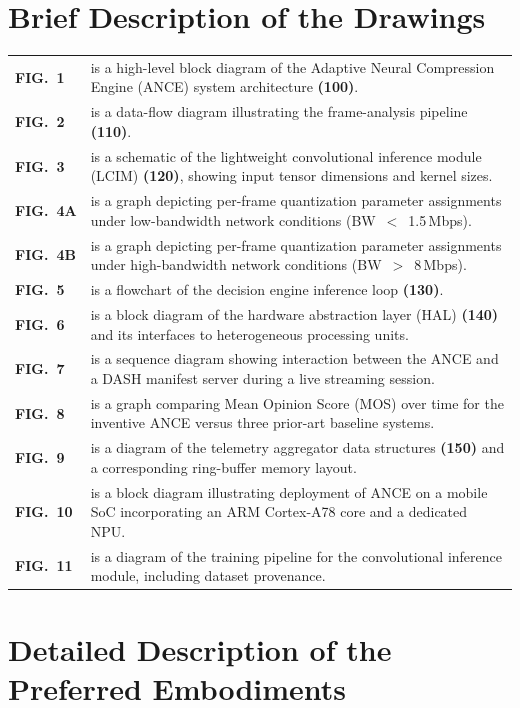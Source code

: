 \documentclass[12pt,letterpaper]{article}
\newcommand{\refnum}[1]{\textbf{(#1)}}
\newcommand{\metarow}[2]{%
  {\color{accent}\bfseries #1} & #2 \\[2pt]%
}
\begin{document}
\section{Brief Description of the Drawings}\label{sec:drawings}

\begin{tabularx}{\linewidth}{@{}>{\color{accent}\bfseries}l@{\hspace{8mm}}>{\raggedright\arraybackslash}X@{}}
  \metarow{FIG.\ 1}{is a high-level block diagram of the Adaptive Neural Compression Engine (ANCE) system architecture \refnum{100}.}
  \metarow{FIG.\ 2}{is a data-flow diagram illustrating the frame-analysis pipeline \refnum{110}.}
  \metarow{FIG.\ 3}{is a schematic of the lightweight convolutional inference module (LCIM) \refnum{120}, showing input tensor dimensions and kernel sizes.}
  \metarow{FIG.\ 4A}{is a graph depicting per-frame quantization parameter assignments under low-bandwidth network conditions (BW~$<$~1.5\,Mbps).}
  \metarow{FIG.\ 4B}{is a graph depicting per-frame quantization parameter assignments under high-bandwidth network conditions (BW~$>$~8\,Mbps).}
  \metarow{FIG.\ 5}{is a flowchart of the decision engine inference loop \refnum{130}.}
  \metarow{FIG.\ 6}{is a block diagram of the hardware abstraction layer (HAL) \refnum{140} and its interfaces to heterogeneous processing units.}
  \metarow{FIG.\ 7}{is a sequence diagram showing interaction between the ANCE and a DASH manifest server during a live streaming session.}
  \metarow{FIG.\ 8}{is a graph comparing Mean Opinion Score (MOS) over time for the inventive ANCE versus three prior-art baseline systems.}
  \metarow{FIG.\ 9}{is a diagram of the telemetry aggregator data structures \refnum{150} and a corresponding ring-buffer memory layout.}
  \metarow{FIG.\ 10}{is a block diagram illustrating deployment of ANCE on a mobile SoC incorporating an ARM Cortex-A78 core and a dedicated NPU.}
  \metarow{FIG.\ 11}{is a diagram of the training pipeline for the convolutional inference module, including dataset provenance.}
\end{tabularx}

\section{Detailed Description of the Preferred Embodiments}\label{sec:detailed}
\end{document}
